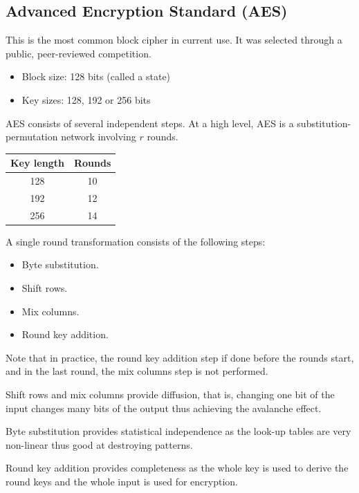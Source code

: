 \documentclass{article}
\begin{document}
\subsection{Advanced Encryption Standard (AES)}
This is the most common block cipher in current use. It was selected through a public, peer-reviewed competition.
\begin{itemize}
	\item Block size: 128 bits (called a state)
	\item Key sizes: 128, 192 or 256 bits
\end{itemize}
AES consists of several independent steps. At a high level, AES is a substitution-permutation network involving $r$ rounds.
\begin{center}
	\begin{tabular}{|c|c|}
		\hline
		Key length & Rounds \\ \hline
		128 & 10 \\
		192 & 12 \\
		256 & 14 \\
		\hline
	\end{tabular}
\end{center}
A single round transformation consists of the following steps:
\begin{itemize}
	\item Byte substitution.
	\item Shift rows.
	\item Mix columns.
	\item Round key addition.
\end{itemize}
Note that in practice, the round key addition step if done before the rounds start, and in the last round, the mix columns step is not performed.

Shift rows and mix columns provide diffusion, that is, changing one bit of the input changes many bits of the output thus achieving the avalanche effect.

Byte substitution provides statistical independence as the look-up tables are very non-linear thus good at destroying patterns.

Round key addition provides completeness as the whole key is used to derive the round keys and the whole input is used for encryption.
\end{document}

